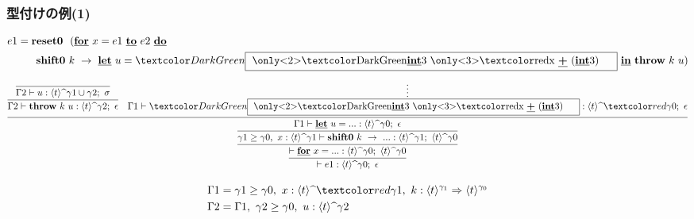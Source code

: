 \newcommand\boxterm{\framebox{
    \only<2>{\green{\cint{3}}}
    \only<3>{\red{x~\cPlus~(\cint{3})}}
    \phantom{A}
  }}

\begin{frame}
  \frametitle{型付けの例(1)}
  \begin{align*}
    e1 & = \Resetz ~~(\cfordo{x = e1}{e2} \\
       & \phantom{=}~~~ \Shiftz~k~\to~
         {\cLet~u=\green{\boxterm}~\cIn}~\Throw~k~u)
  \end{align*}

  \[
    \infer{\vdash e1 : \codeTs{t}{\gamma0};~\epsilon}
    {\infer{\vdash \cfor{x=...} :
        \codeTs{t}{\gamma0};~\codeTs{t}{\gamma0}}
      {\infer{\gamma1 \ord \gamma0,~x:\codeTs{t}{\gamma1}
          \vdash \Shiftz~k~\to~... :
          \codeTs{t}{\gamma1};~\codeTs{t}{\gamma0}}
        {\infer{\Gamma1 \vdash \cLet~u=...:\codeTs{t}{\gamma0};~\epsilon}
          {\infer{\Gamma2 \vdash
              \Throw~k~u:\codeTs{t}{\gamma2};~\epsilon }
            {\infer{\Gamma2 \vdash
                u:\codeTs{t}{\gamma1 \cup \gamma2};~ \sigma}
              {}
            }
            &\infer*{\Gamma1 \vdash
              \green{\boxterm}:\codeTs{t}{\red{\gamma0}};~\epsilon}
            {}
          }
        }
      }
    }
  \]

  {\footnotesize
    \begin{align*}
      \Gamma1 &= \gamma1 \ord \gamma0,~x:\codeTs{t}{\red{\gamma1}},
                ~k: \contT{\codeT{t}{\gamma_1}}{\codeT{t}{\gamma_0}} \\
      \Gamma2 &= \Gamma1,~\gamma2 \ord \gamma0,~u:\codeTs{t}{\gamma2}
    \end{align*}
  }


\end{frame}




